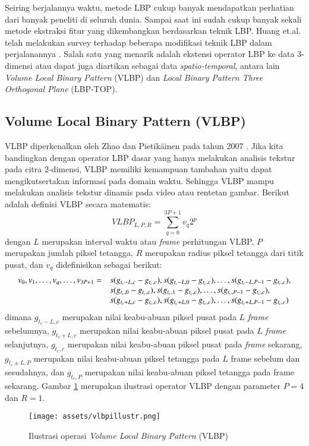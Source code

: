 \documentclass[review,3p,12pt]{elsarticle}
\begin{document}
Seiring berjalannya waktu, metode LBP cukup banyak mendapatkan perhatian dari banyak peneliti di seluruh dunia. Sampai saat ini sudah cukup banyak sekali metode ekstraksi fitur yang dikembangkan berdasarkan teknik LBP. Huang et.al. telah melakukan survey terhadap beberapa modifikasi teknik LBP dalam perjalanannya \cite{huang2011local}. Salah satu yang menarik adalah ekstensi operator LBP ke data 3-dimensi atau dapat juga diartikan sebagai data \textit{spatio-temporal}, antara lain \textit{Volume Local Binary Pattern} (VLBP) dan \textit{Local Binary Pattern Three Orthogonal Plane} (LBP-TOP).

\subsection{Volume Local Binary Pattern (VLBP)}
\label{vlbp}

VLBP diperkenalkan oleh Zhao dan Pietik\"{a}inen pada tahun 2007 \cite{zhao2007dynamic}. Jika kita bandingkan dengan operator LBP dasar yang hanya melakukan analisis tekstur pada citra 2-dimensi, VLBP memiliki kemampuan tambahan yaitu dapat mengikutsertakan informasi pada domain waktu. Sehingga VLBP mampu melakukan analisis tekstur dinamis pada video atau rentetan gambar. Berikut adalah definisi VLBP secara matematis:
\begin{equation}
VLBP_{L,P,R} = \sum_{q=0}^{3P+1} v_q 2^p
\end{equation}
dengan $L$ merupakan interval waktu atau \textit{frame} perhitungan VLBP, $P$ merupakan jumlah piksel tetangga, $R$ merupakan radius piksel tetangga dari titik pusat, dan $v_q$ didefinisikan sebagai berikut:
\begin{equation}
\begin{array}{l l}
v_0, v_1, \dots, v_q, \dots, v_{3P+1} = & s(g_{t_c-L,c} - g_{t_c,c}), s(g_{t_c-L,0} - g_{t_c,c}), \dots, s(g_{t_c-L,P-1} - g_{t_c,c}),\\
& s(g_{t_c,0} - g_{t_c,c}), s(g_{t_c,1} - g_{t_c,c}), \dots, s(g_{t_c,P-1} - g_{t_c,c}),\\
& s(g_{t_c+L,c} - g_{t_c,c}), s(g_{t_c+L,0} - g_{t_c,c}), \dots, s(g_{t_c+L,P-1} - g_{t_c,c})
\end{array}
\end{equation}
dimana $g_{t_c-L,c}$ merupakan nilai keabu-abuan piksel pusat pada $L$ \textit{frame} sebelumnya, $g_{t_c+L,c}$ merupakan nilai keabu-abuan piksel pusat pada $L$ \textit{frame} selanjutnya, $g_{t_c,c}$ merupakan nilai keabu-abuan piksel pusat pada \textit{frame} sekarang, $g_{t_c \pm L,P}$ merupakan nilai keabu-abuan piksel tetangga pada $L$ frame sebelum dan sesudahnya, dan $g_{t_c,P}$ merupakan nilai keabu-abuan piksel tetangga pada frame sekarang. Gambar \ref{fig:vlbpillustr} merupakan ilustrasi operator VLBP dengan parameter $P = 4$ dan $R = 1$.
\begin{figure}[hbt!]
\caption{Ilustrasi operasi \textit{Volume Local Binary Pattern} (VLBP)}
\label{fig:vlbpillustr}
\centering
	\texttt{[image: assets/vlbpillustr.png]}
\end{figure}
\end{document}
